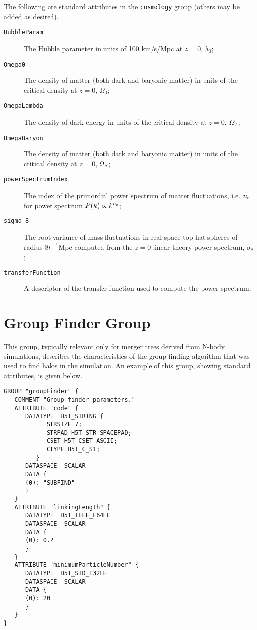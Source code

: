 The following are standard attributes in the {\tt cosmology} group (others may be added as desired).

\begin{description}
 \item [{\tt HubbleParam}] The Hubble parameter in units of 100 km/s/Mpc at $z=0$, $h_0$;
 \item [{\tt Omega0}] The density of matter (both dark and baryonic matter) in units of the critical density at $z=0$, $\Omega_0$;
 \item [{\tt OmegaLambda}] The density of dark energy in units of the critical density at $z=0$, $\Omega_\Lambda$;
 \item [{\tt OmegaBaryon}] The density of matter (both dark and baryonic matter) in units of the critical density at $z=0$, $\Omega_{\rm b}$;
 \item [{\tt powerSpectrumIndex}] The index of the primordial power spectrum of matter fluctuations, i.e. $n_{\rm s}$ for power spectrum $P(k) \propto k^{n_{\rm s}}$;
 \item [{\tt sigma\_8}] The root-variance of mass fluctuations in real space top-hat spheres of radius $8h^{-1}$Mpc computed from the $z=0$ linear theory power spectrum, $\sigma_8$;
 \item [{\tt transferFunction}] A descriptor of the transfer function used to compute the power spectrum.
\end{description}

\section{Group Finder Group}

This group, typically relevant only for merger trees derived from N-body simulations, describes the characteristics of the group finding algorithm that was used to find halos in the simulation. An example of this group, showing standard attributes, is given below.

\begin{verbatim}
GROUP "groupFinder" {
   COMMENT "Group finder parameters."
   ATTRIBUTE "code" {
      DATATYPE  H5T_STRING {
            STRSIZE 7;
            STRPAD H5T_STR_SPACEPAD;
            CSET H5T_CSET_ASCII;
            CTYPE H5T_C_S1;
         }
      DATASPACE  SCALAR
      DATA {
      (0): "SUBFIND"
      }
   }
   ATTRIBUTE "linkingLength" {
      DATATYPE  H5T_IEEE_F64LE
      DATASPACE  SCALAR
      DATA {
      (0): 0.2
      }
   }
   ATTRIBUTE "minimumParticleNumber" {
      DATATYPE  H5T_STD_I32LE
      DATASPACE  SCALAR
      DATA {
      (0): 20
      }
   }
}
\end{verbatim}

